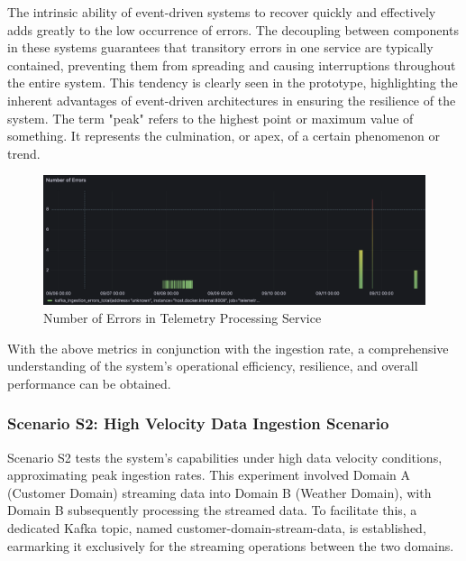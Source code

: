 \documentclass[review]{elsarticle}
\begin{document}
The intrinsic ability of event-driven systems to recover quickly and effectively adds greatly to the low occurrence of errors. The decoupling between components in these systems guarantees that transitory errors in one service are typically contained, preventing them from spreading and causing interruptions throughout the entire system. This tendency is clearly seen in the prototype, highlighting the inherent advantages of event-driven architectures in ensuring the resilience of the system. The term "peak" refers to the highest point or maximum value of something. It represents the culmination, or apex, of a certain phenomenon or trend.

\begin{figure}

  \centering

  \includegraphics[width=\columnwidth]{images/number-of-errors-in-telemetry-processing-service.png}

  \caption{Number of Errors in Telemetry Processing Service}

  \label{numberOfErrorsInTelemetryProcessingService}

\end{figure}

With the above metrics in conjunction with the ingestion rate, a comprehensive understanding of the system's operational efficiency, resilience, and overall performance can be obtained.

\subsubsection{Scenario S2: High Velocity Data Ingestion Scenario}

Scenario S2 tests the system's capabilities under high data velocity conditions, approximating peak ingestion rates. This experiment involved Domain A (Customer Domain) streaming data into Domain B (Weather Domain), with Domain B subsequently processing the streamed data. To facilitate this, a dedicated Kafka topic, named customer-domain-stream-data, is established, earmarking it exclusively for the streaming operations between the two domains. 
\end{document}

